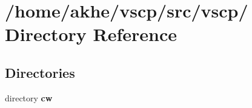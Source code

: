 \section{/home/akhe/vscp/src/vscp/ Directory Reference}
\label{dir_e3a3cd95d908554383e058b46d1c63ec}
\subsection*{Directories}
\begin{CompactItemize}
\item 
directory {\bf cw}
\end{CompactItemize}
